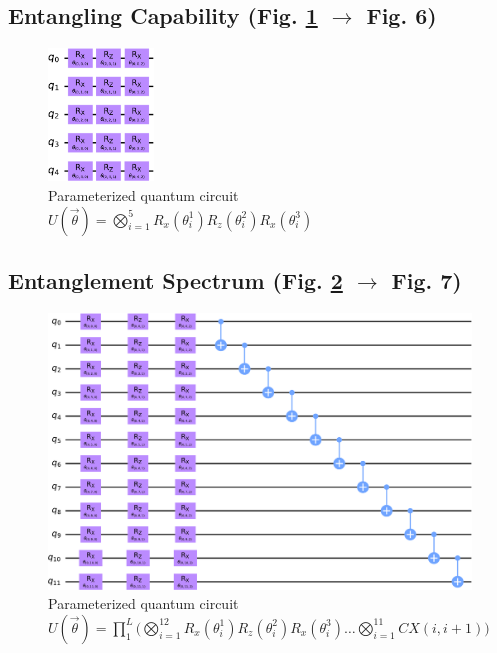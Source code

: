 \documentclass[%
 reprint,
 amsmath,
 amssymb,
 showkeys,
 pra,
 floatfix,
 onecolumn,
]{revtex4-2}
\begin{document}
\subsection{Entangling Capability (Fig. \ref{fig:entg-circuit} $\rightarrow$ Fig. 6)}
\begin{figure}[!h]
    \centering
    \includegraphics[width=0.25\textwidth]{images/entg_circuit.pdf}
    \caption{Parameterized quantum circuit $U(\vec{\theta}) = \bigotimes_{i=1}^{5}R_x(\theta_i^1)R_z(\theta_i^2)R_x(\theta_i^3)$}
    \label{fig:entg-circuit}
\end{figure}

\subsection{Entanglement Spectrum (Fig. \ref{fig:spec-circuit} $\rightarrow$ Fig. 7)}
\begin{figure}[!h]
    \centering
    \includegraphics[width=\textwidth]{images/spec_circuit.pdf}
    \caption{Parameterized quantum circuit $U(\vec{\theta}) = \prod_{1}^{L}\big(\bigotimes_{i=1}^{12}R_x(\theta_i^1)R_z(\theta_i^2)R_x(\theta_i^3) \ldots \bigotimes_{i=1}^{11}CX(i, i+1)\big)$}
    \label{fig:spec-circuit}
\end{figure}



%


\end{document}
